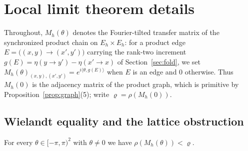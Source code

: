 \section{Local limit theorem details}
\label{app:F}

Throughout, \(M_h(\theta)\) denotes the Fourier-tilted transfer matrix of the
synchronized product chain on \(E_h\times E_h\): for a product edge
\(E=\bigl((x,y)\to(x',y')\bigr)\) carrying the rank-two increment
\(g(E)=\eta(y\to y')-\eta(x'\to x)\) of Section~\ref{sec:fold}, we set
\(M_h(\theta)_{(x,y),(x',y')}=e^{i\langle\theta,g(E)\rangle}\) when \(E\) is an
edge and \(0\) otherwise. Thus \(M_h(0)\) is the adjacency matrix of the
product graph, which is primitive by Proposition~\ref{prop:graph}(5); write
\(\varrho=\rho(M_h(0))\).

\subsection{Wielandt equality and the lattice obstruction}

\begin{lemma}
\label{lem:F1}
For every \(\theta\in[-\pi,\pi)^2\) with \(\theta\neq0\) we have
\(\rho(M_h(\theta))<\varrho\).
\end{lemma}

